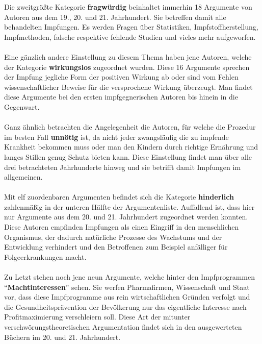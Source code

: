 \documentclass[
    a4paper,
    12pt,
    hyphens,
    chapterprefix=true,
    headheight=33pt,
    footheight=29pt,
    headings=optiontohead, %
]{scrartcl}
\begin{document}
{Die zweitgrößte Kategorie \textbf{fragwürdig} beinhaltet immerhin 18 Argumente von Autoren aus dem 19., 20. und 21. Jahrhundert. Sie betreffen damit alle behandelten Impfungen. Es werden Fragen über Statistiken, Impfstoffherstellung, Impfmethoden, falsche respektive fehlende Studien und vieles mehr aufgeworfen. \\
\\
Eine gänzlich andere Einstellung zu diesem Thema haben jene Autoren, welche der Kategorie \textbf{wirkungslos} zugeordnet wurden. Diese 16 Argumente sprechen der Impfung jegliche Form der positiven Wirkung ab oder sind vom Fehlen wissenschaftlicher Beweise für die versprochene Wirkung überzeugt. Man  findet diese Argumente bei den ersten impfgegnerischen Autoren bis hinein in die Gegenwart. \\
\\
Ganz ähnlich betrachten die Angelegenheit die Autoren, für welche die Prozedur im besten Fall \textbf{unnötig} ist, da nicht jeder zwangsläufig die zu impfende Krankheit bekommen muss oder man den Kindern durch richtige Ernährung und langes Stillen genug Schutz bieten kann. Diese Einstellung findet man über alle drei betrachteten Jahrhunderte hinweg und sie betrifft damit Impfungen im allgemeinen.\\
\\
Mit elf zuordenbaren Argumenten befindet sich die Kategorie \textbf{hinderlich} zahlenmäßig in der unteren Hälfte der Argumentenliste. Auffallend ist, dass hier nur Argumente aus dem 20. und 21. Jahrhundert zugeordnet werden konnten. Diese Autoren empfinden Impfungen als einen Eingriff in den menschlichen Organismus, der dadurch natürliche Prozesse des Wachstums und der Entwicklung verhindert und den Betroffenen zum Beispiel anfälliger für Folgeerkrankungen macht.\\
\\
Zu Letzt stehen noch jene neun Argumente, welche hinter den Impfprogrammen "`\textbf{Machtinteressen}"' sehen. Sie werfen Pharmafirmen, Wissenschaft und Staat vor, dass diese Impfprogramme aus rein wirtschaftlichen Gründen verfolgt und die Gesundheitsprävention der Bevölkerung nur das eigentliche Interesse nach Profitmaximierung verschleiern soll. Diese Art der mitunter verschwörungstheoretischen Argumentation findet sich in den ausgewerteten Büchern im 20. und 21. Jahrhundert.




}
\end{document}
